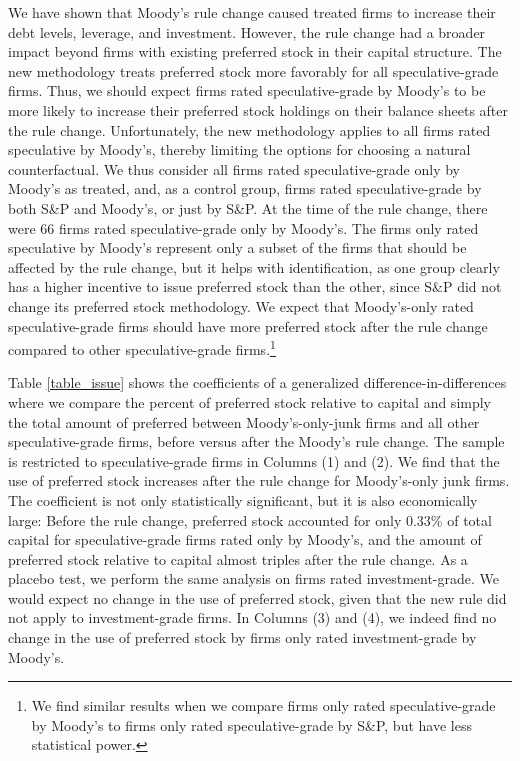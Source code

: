 \documentclass[a4paper, 12pt]{article}
\begin{document}
We have shown that Moody's rule change caused treated firms to increase their debt levels, leverage, and investment. However, the rule change had a broader impact beyond firms with existing preferred stock in their capital structure. The new methodology treats preferred stock more favorably for all speculative-grade firms. Thus, we should expect firms rated speculative-grade by Moody's to be more likely to increase their preferred stock holdings on their balance sheets after the rule change. Unfortunately, the new methodology applies to all firms rated speculative by Moody's, thereby limiting the options for choosing a natural counterfactual. We thus consider all firms rated speculative-grade only by Moody's as treated, and, as a control group, firms rated speculative-grade by both S\&P and Moody's, or just by S\&P. At the time of the rule change, there were 66 firms rated speculative-grade only by Moody's. The firms only rated speculative by Moody's represent only a subset of the firms that should be affected by the rule change, but it helps with identification, as one group clearly has a higher incentive to issue preferred stock than the other, since S\&P did not change its preferred stock methodology. We expect that Moody's-only rated speculative-grade firms should have more preferred stock after the rule change compared to other speculative-grade firms.\footnote{We find similar results when we compare firms only rated speculative-grade by Moody's to firms only rated speculative-grade by S\&P, but have less statistical power.}

Table \ref{table_issue} shows the coefficients of a generalized difference-in-differences where we compare the percent of preferred stock relative to capital and simply the total amount of preferred between Moody's-only-junk firms and all other speculative-grade firms, before versus after the Moody's rule change. The sample is restricted to speculative-grade firms in Columns (1) and (2). We find that the use of preferred stock increases after the rule change for Moody's-only junk firms. The coefficient is not only statistically significant, but it is also economically large: Before the rule change, preferred stock accounted for only 0.33\% of total capital for speculative-grade firms rated only by Moody's, and the amount of preferred stock relative to capital almost triples after the rule change. As a placebo test, we perform the same analysis on firms rated investment-grade. We would expect no change in the use of preferred stock, given that the new rule did not apply to investment-grade firms. In Columns (3) and (4), we indeed find no change in the use of preferred stock by firms only rated investment-grade by Moody's.
\end{document}
